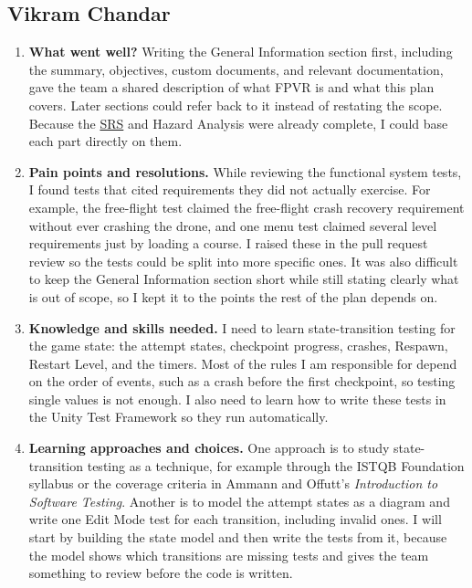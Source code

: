 \documentclass[12pt, titlepage]{article}
\begin{document}
\subsection*{Vikram Chandar}

\begin{enumerate}
  \item \textbf{What went well?}
  Writing the General Information section first, including the summary,
  objectives, custom documents, and relevant documentation, gave the team a
  shared description of what FPVR is and what this plan covers. Later sections
  could refer back to it instead of restating the scope. Because the \hyperlink{abbr:SRS}{SRS} and
  Hazard Analysis were already complete, I could base each part directly on
  them.

  \item \textbf{Pain points and resolutions.}
  While reviewing the functional system tests, I found tests that cited
  requirements they did not actually exercise. For example, the free-flight test
  claimed the free-flight crash recovery requirement without ever crashing the
  drone, and one menu test claimed several level requirements just by loading a
  course. I raised these in the pull request review so the tests could be split
  into more specific ones. It was also difficult to keep the General Information
  section short while still stating clearly what is out of scope, so I kept it to
  the points the rest of the plan depends on.

  \item \textbf{Knowledge and skills needed.}
  I need to learn state-transition testing for the game state: the attempt
  states, checkpoint progress, crashes, Respawn, Restart Level, and the timers.
  Most of the rules I am responsible for depend on the order of events, such as a
  crash before the first checkpoint, so testing single values is not enough.
  I also need to learn how to write these tests in the Unity Test Framework so
  they run automatically.

  \item \textbf{Learning approaches and choices.}
  One approach is to study state-transition testing as a technique, for example
  through the ISTQB Foundation syllabus or the coverage criteria in Ammann and
  Offutt's \emph{Introduction to Software Testing}. Another is to model the
  attempt states as a diagram and write one Edit Mode test for each transition,
  including invalid ones. I will start by building the state model and then write
  the tests from it, because the model shows which transitions are missing tests
  and gives the team something to review before the code is written.
\end{enumerate}
\end{document}
